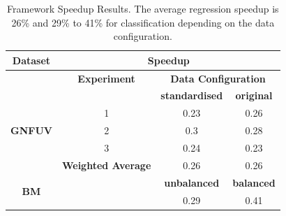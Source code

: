 \documentclass{mpaper}
\begin{document}
\begin{table}[]
\centering
\begin{tabular}{|c|ccc|}
\hline
\textbf{Dataset}             & \multicolumn{3}{c|}{\textbf{Speedup}}                                                             \\ \hline
                             & \multicolumn{1}{c|}{\textbf{Experiment}}       & \multicolumn{2}{c|}{\textbf{Data Configuration}} \\ \cline{2-4} 
                             & \multicolumn{1}{l|}{}                          & \textbf{standardised}     & \textbf{original}    \\ \cline{2-4} 
                             & \multicolumn{1}{c|}{1}                         & 0.23                      & 0.26                 \\
\textbf{GNFUV}               & \multicolumn{1}{c|}{2}                         & 0.3                       & 0.28                 \\
                             & \multicolumn{1}{c|}{3}                         & 0.24                      & 0.23                 \\ \cline{2-4} 
                             & \multicolumn{1}{c|}{\textbf{Weighted Average}} & 0.26                      & 0.26                 \\ \hline
\multirow{2}{*}{\textbf{BM}} & \multicolumn{1}{l|}{}                          & \textbf{unbalanced}       & \textbf{balanced}    \\ \cline{3-4} 
                             & \multicolumn{1}{c|}{\textbf{}}                 & 0.29                      & 0.41                 \\ \hline
\end{tabular}
\caption{\label{tab:speedup}Framework Speedup Results. The average regression speedup is 26\% and 29\% to 41\% for classification depending on the data configuration.}
\end{table}
\end{document}
